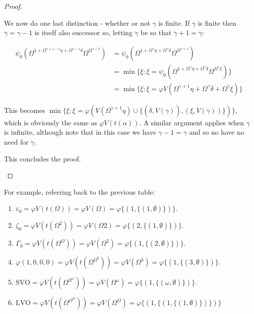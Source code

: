 \documentclass{article}
\theoremstyle{definition}
\theoremstyle{plain}
\theoremstyle{plain}
\theoremstyle{plain}
\theoremstyle{plain}
\theoremstyle{remark}
\theoremstyle{remark}
\theoremstyle{remark}
\theoremstyle{plain}
\theoremstyle{plain}
\begin{document}
\begin{proof}
\begin{enumerate}
\begin{enumerate}
\begin{enumerate}
\begin{enumerate}
                We now do one last distinction - whether or not $\gamma$ is finite. If $\gamma$ is finite then $\dot{\gamma} = \gamma-1$ is itself also successor so, letting $\ddot\gamma$ be so that $\ddot\gamma+1 = \dot{\gamma}$:

                \begin{equation}
                \begin{split}
                \psi_0(\Omega^{1 + \Omega^{\gamma+1-1} \eta + \Omega^{\gamma-1} \dot{\delta}} \Omega^{\Omega^{\gamma-1}}) & = \psi_0(\Omega^{1 + \Omega^\gamma \eta + \Omega^{\dot{\gamma}} \dot{\delta}} \Omega^{\Omega^{\ddot\gamma+1}}) \\ & = \min\{\xi: \xi = \psi_0(\Omega^{1 + \Omega^\gamma \eta + \Omega^{\dot{\gamma}} \dot{\delta}} \Omega^{\Omega^{\ddot\gamma} \xi})\} \\ & = \min\{\xi: \xi = \varphi V(\Omega^{\gamma+1} \eta + \Omega^\gamma \dot{\delta} + \Omega^{\dot{\gamma}} \xi)\}
                \end{split}
                \end{equation}

                This becomes $\min\{\xi: \xi = \varphi (V(\Omega^{\gamma+1} \eta) \cup \{(\dot{\delta}, V(\gamma)), (\xi,V(\dot{\gamma}))\})\}$, which is obviously the same as $\varphi V(t(\alpha))$. A similar argument applies when $\gamma$ is infinite, although note that in this case we have $\gamma - 1 = \gamma$ and so no have no need for $\ddot\gamma$.

                This concludes the proof. \qedhere
            \end{enumerate}
        \end{enumerate}
    \end{enumerate}
\end{enumerate}
\end{proof}

For example, referring back to the previous table:

\begin{enumerate}
    \item $\varepsilon_0 = \varphi V(t(\Omega)) = \varphi V(\Omega) = \varphi \{(1,\{(1,\emptyset)\})\}$.
    \item $\zeta_0 = \varphi V(t(\Omega^2)) = \varphi V(\Omega 2) = \varphi \{(2,\{(1,\emptyset)\})\}$.
    \item $\Gamma_0 = \varphi V(t(\Omega^\Omega)) = \varphi V(\Omega^2) = \varphi \{(1,\{(2,\emptyset)\})\}$.
    \item $\varphi(1, 0, 0, 0) = \varphi V(t(\Omega^{\Omega^2})) = \varphi V(\Omega^3) = \varphi \{(1,\{(3,\emptyset)\})\}$.
    \item $\mathrm{SVO} = \varphi V(t(\Omega^{\Omega^\omega})) = \varphi V(\Omega^\omega) = \varphi \{(1,\{(\omega,\emptyset)\})\}$.
    \item $\mathrm{LVO} = \varphi V(t(\Omega^{\Omega^\Omega})) = \varphi V(\Omega^\Omega) = \varphi \{(1,\{(1,\{(1,\emptyset)\})\})\}$
\end{enumerate}
\end{document}
